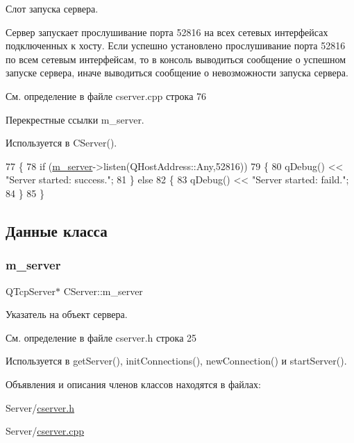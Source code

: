 Слот запуска сервера. 

Сервер запускает прослушивание порта 52816 на всех сетевых интерфейсах подключенных к хосту. Если успешно установлено прослушивание порта 52816 по всем сетевым интерфейсам, то в консоль выводиться сообщение о успешном запуске сервера, иначе выводиться сообщение о невозможности запуска сервера. 

См. определение в файле cserver.\+cpp строка 76



Перекрестные ссылки m\+\_\+server.



Используется в C\+Server().


\begin{DoxyCode}
77 \{
78     \textcolor{keywordflow}{if} (\hyperlink{class_c_server_a0ee5b734ddfc86fc181e767700f7a46b}{m\_server}->listen(QHostAddress::Any,52816))
79     \{
80         qDebug() << \textcolor{stringliteral}{"Server started: success."};
81     \} \textcolor{keywordflow}{else}
82     \{
83         qDebug() << \textcolor{stringliteral}{"Server started: faild."};
84     \}
85 \}
\end{DoxyCode}


\subsection{Данные класса}
\hypertarget{class_c_server_a0ee5b734ddfc86fc181e767700f7a46b}{}\label{class_c_server_a0ee5b734ddfc86fc181e767700f7a46b} 
\subsubsection{\texorpdfstring{m\+\_\+server}{m\_server}}
{\footnotesize\ttfamily Q\+Tcp\+Server$\ast$ C\+Server\+::m\+\_\+server\hspace{0.3cm}{\ttfamily [private]}}



Указатель на объект сервера. 



См. определение в файле cserver.\+h строка 25



Используется в get\+Server(), init\+Connections(), new\+Connection() и start\+Server().



Объявления и описания членов классов находятся в файлах\+:\begin{DoxyCompactItemize}
\item 
Server/\hyperlink{cserver_8h}{cserver.\+h}\item 
Server/\hyperlink{cserver_8cpp}{cserver.\+cpp}\end{DoxyCompactItemize}
